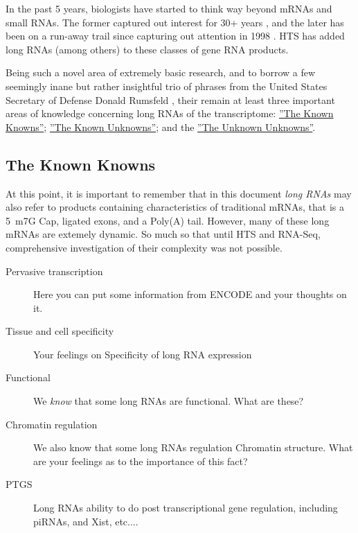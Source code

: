 In the past 5 years, biologists have started to think way beyond mRNAs and small RNAs. The former captured out interest for 30+ years \citep{Furuichi1975,Wei1975}, and the later has been on a run-away trail since capturing out attention in 1998 \citep{Fire1998}. HTS has added long RNAs (among others) to these classes of gene RNA products. 

Being such a novel area of extremely basic research, and to borrow a few seemingly inane but rather insightful trio of phrases from the United States Secretary of Defense Donald Rumsfeld \citep{Rumsfeld2011}, their remain at least three important areas of knowledge concerning long RNAs of the transcriptome: 
\hyperref[subsec: The Known Knowns]{''The Known Knowns''}; 
\hyperref[subsec: The Known Unknowns]{''The Known Unknowns''}; 
and the \hyperref[subsec: The Unknown Unknowns]{''The Unknown Unknowns''}.

\subsection{The Known Knowns}\label{subsec: The Known Knowns}

At this point, it is important to remember that in this document \textit{long RNAs} may also refer to products containing characteristics of traditional mRNAs, that is a 5\textprime~m7G Cap, ligated exons, and a Poly(A) tail. However, many of these long mRNAs are extemely dynamic. So much so that until HTS and RNA-Seq, comprehensive investigation of their complexity was not possible.


\begin{description}
	\item[Pervasive transcription]
	Here you can put some information from ENCODE and your thoughts on it.

	\item[Tissue and cell specificity]
	Your feelings on Specificity of long RNA expression

	\item[Functional]
	We \textit{know} that some long RNAs are functional. What are these?

	\item[Chromatin regulation]
	We also know that some long RNAs regulation Chromatin structure. What are your feelings as to the importance of this fact?

	\item[PTGS]
	Long RNAs ability to do post transcriptional gene regulation, including piRNAs, and Xist, etc....

\end{description}

